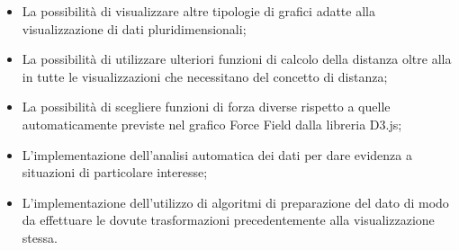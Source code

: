\documentclass[../analisi-dei-requisiti.tex]{subfiles}
\begin{document}
\begin{itemize}
    \item La possibilità di visualizzare altre tipologie di grafici adatte alla visualizzazione di dati 
    pluridimensionali;
    \item La possibilità di utilizzare ulteriori funzioni di calcolo della distanza oltre alla 
     in tutte le visualizzazioni che necessitano del concetto di distanza;
    \item La possibilità di scegliere funzioni di forza diverse rispetto a quelle automaticamente previste nel grafico 
    Force Field dalla libreria D3.js;
    \item L'implementazione dell'analisi automatica dei dati per dare evidenza a situazioni di particolare interesse;
    \item L'implementazione dell'utilizzo di algoritmi di preparazione del dato di modo da effettuare le dovute 
    trasformazioni precedentemente alla visualizzazione stessa.
\end{itemize}
\end{document}
